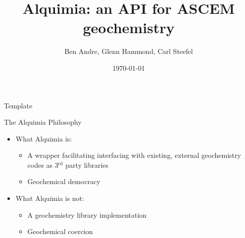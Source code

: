\documentclass{beamer}
\newcommand\redcolor[1]{{{\color{red} #1}}}
\newcommand\bluecolor[1]{{{\color{blue} #1}}}
\begin{document}
\title[Alquimia]{Alquimia: an API for ASCEM geochemistry}
\author[]{Ben Andre, Glenn Hammond, Carl Steefel}
\date{\today}

\begin{frame}{Template}
\end{frame}

\frame{\titlepage}

\begin{frame}{The Alquimia Philosophy}
\Large
\begin{itemize}
\item What Alquimia \bluecolor{is}:
\begin{itemize}
\Large
\item A wrapper facilitating interfacing with existing, external
      geochemistry codes as 3$^\text{rd}$ party libraries
\item Geochemical democracy
\end{itemize}

\vspace{1cm}
\item What Alquimia \redcolor{is not}:
\begin{itemize}
\Large
\item A geochemistry library implementation
\item Geochemical coercion
\end{itemize}
\end{itemize}
\end{frame}
\end{document}
